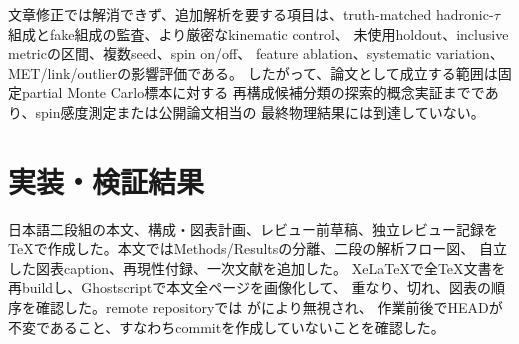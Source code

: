 \documentclass[xelatex,ja=standard,a4paper,10pt]{bxjsarticle}
\begin{document}
文章修正では解消できず、追加解析を要する項目は、truth-matched
hadronic-\(\tau\)組成とfake組成の監査、より厳密なkinematic control、
未使用holdout、inclusive metricの区間、複数seed、spin on/off、
feature ablation、systematic variation、MET/link/outlierの影響評価である。
したがって、論文として成立する範囲は固定partial Monte Carlo標本に対する
再構成候補分類の探索的概念実証までであり、spin感度測定または公開論文相当の
最終物理結果には到達していない。

\section{実装・検証結果}

日本語二段組の本文、構成・図表計画、レビュー前草稿、独立レビュー記録を
TeXで作成した。本文ではMethods/Resultsの分離、二段の解析フロー図、
自立した図表caption、再現性付録、一次文献を追加した。
XeLaTeXで全TeX文書を再buildし、Ghostscriptで本文全ページを画像化して、
重なり、切れ、図表の順序を確認した。remote repositoryでは
がにより無視され、
作業前後でHEADが不変であること、すなわちcommitを作成していないことを確認した。
\end{document}
